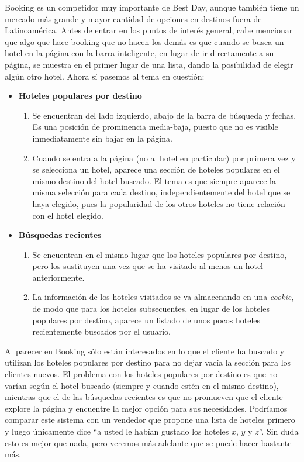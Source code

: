 \documentclass[12pt]{report}
\begin{document}
Booking es un competidor muy importante de Best Day, aunque también tiene un mercado más grande y mayor cantidad de opciones en destinos fuera de Latinoamérica. Antes de entrar en los puntos de interés general, cabe mencionar que algo que hace booking que no hacen los demás es que cuando se busca un hotel en la página con la barra inteligente, en lugar de ir directamente a su página, se muestra en el primer lugar de una lista, dando la posibilidad de elegir algún otro hotel. Ahora sí pasemos al tema en cuestión:
\begin{itemize}
	\item \textbf{Hoteles populares por destino}
	\begin{enumerate}
		\item Se encuentran del lado izquierdo, abajo de la barra de búsqueda y fechas. Es una posición de prominencia media-baja, puesto que no es visible inmediatamente sin bajar en la página.
		\item Cuando se entra a la página (no al hotel en particular) por primera vez y se selecciona un hotel, aparece una sección de hoteles populares en el mismo destino del hotel buscado. El tema es que siempre aparece la misma selección para cada destino, independientemente del hotel que se haya elegido, pues la popularidad de los otros hoteles no tiene relación con el hotel elegido.
	\end{enumerate}
	\item \textbf{Búsquedas recientes}
	\begin{enumerate}
		\item Se encuentran en el mismo lugar que los hoteles populares por destino, pero los sustituyen una vez que se ha visitado al menos un hotel anteriormente.
		\item La información de los hoteles visitados se va almacenando en una \emph{cookie}, de modo que para los hoteles subsecuentes, en lugar de los hoteles populares por destino, aparece un listado de unos pocos hoteles recientemente buscados por el usuario.
	\end{enumerate}
\end{itemize}
Al parecer en Booking sólo están interesados en lo que el cliente ha buscado y utilizan los hoteles populares por destino para no dejar vacía la sección para los clientes nuevos. El problema con los hoteles populares por destino es que no varían según el hotel buscado (siempre y cuando estén en el mismo destino), mientras que el de las búsquedas recientes es que no promueven que el cliente explore la página y encuentre la mejor opción para sus necesidades. Podríamos comparar este sistema con un vendedor que propone una lista de hoteles primero y luego únicamente dice ``a usted le habían gustado los hoteles $x$, $y$ y $z$''. Sin duda esto es mejor que nada, pero veremos más adelante que se puede hacer bastante más.
\end{document}
